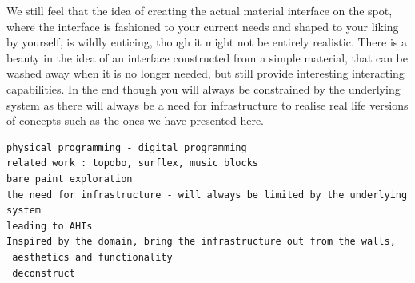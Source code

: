 
We still feel that the idea of creating the actual material interface on the spot, where the interface is fashioned to your current needs and shaped to your liking by yourself, is wildly enticing, though it might not be entirely realistic.
There is a beauty in the idea of an interface constructed from a simple material, that can be washed away when it is no longer needed, but still provide interesting interacting capabilities.
In the end though you will always be constrained by the underlying system as there will always be a need for infrastructure to realise real life versions of concepts such as the ones we have presented here.

\begin{verbatim}
physical programming - digital programming
related work : topobo, surflex, music blocks
bare paint exploration
the need for infrastructure - will always be limited by the underlying system
leading to AHIs
Inspired by the domain, bring the infrastructure out from the walls,
 aesthetics and functionality
 deconstruct
\end{verbatim}